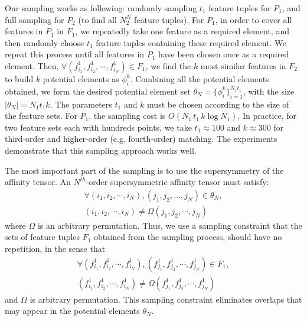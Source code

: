 Our sampling works as following: randomly sampling $t_1$ feature tuples for $P_1$, and full sampling for $P_2$ (to find all $N_2^N$ feature tuples).
For $P_1$, in order to cover all features in $P_1$ in $F_1$, we repeatedly take one feature as a required element,
and then  randomly choose $t_1$ feature tuples containing these required element.
We repeat this process until all features in $P_1$ have been chosen once as a required element.
Then, $\forall (f_{i_1}^1, f_{i_2}^1, \cdots, f_{i_N}^1)\in F_1$, we find the $k$ most similar features in $F_2$ to build $k$ potential elements as $\phi_i^k$.
Combining all the potential elements obtained, we form the desired potential element set $\theta_N = \{\phi_i^k\}_{i=1}^{N_1 t_1}$, with the size $|\theta_N| = N_1 t_1 k$.
The parameters $t_1$ and $k$ must be chosen according to the size of the feature sets.
For $P_1$, the sampling cost is $O(N_1\, t_1\,  k\log N_1)$.
In practice, for two feature sets each with hundreds points,
we take $t_1 \approx 100$ and $k \approx 300$ for third-order and higher-order (e.g. fourth-order) matching.
The experiments demonstrate that this sampling approach works well.


The most important part of the sampling is to use the supersymmetry of the affinity tensor.
An $N^{th}$-order supersymmetric affinity tensor must satisfy:
\begin{eqnarray}
\label{equ:noredun}
\forall (i_1,i_2,\cdots,i_N),(j_1,j_2,\ldots,j_N) \in \theta_N,\nonumber\\(i_1,i_2,\cdots,i_N)\neq\Omega(j_1,j_2,\cdots,j_N)
\end{eqnarray}
where $\Omega$ is an arbitrary permutation.
Thus, we use a sampling constraint that the sets of feature tuples $F_1$ obtained from the sampling process, should have no repetition, in the sense that
\begin{eqnarray}
\label{equ:noredun2}
\forall (f_{i_1}^1,f_{i_2}^1,\cdots,f_{i_N}^1),(f_{j_1}^1,f_{j_2}^1,\cdots,f_{j_N}^1) \in F_1,\nonumber\\ (f_{i_1}^1,f_{i_2}^1,\cdots,f_{i_N}^1)\neq\Omega(f_{j_1}^1,f_{j_2}^1,\cdots,f_{j_N}^1)
\end{eqnarray}
and $\Omega$ is arbitrary permutation.
This sampling constraint eliminates overlaps that may appear in the potential elements $\theta_N$.

